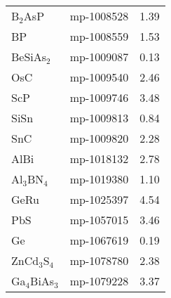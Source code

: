 \begin{center}
\begin{longtable}{M{3.5cm} M{6.5cm} M{2.0cm}}
  B$_2$AsP & mp-1008528 & 1.39\\
  BP & mp-1008559 & 1.53\\
  BeSiAs$_2$ & mp-1009087 & 0.13\\
  OsC & mp-1009540 & 2.46\\
  ScP & mp-1009746 & 3.48\\
  SiSn & mp-1009813 & 0.84\\
  SnC & mp-1009820 & 2.28\\
  AlBi & mp-1018132 & 2.78\\
  Al$_3$BN$_4$ & mp-1019380 & 1.10\\
  GeRu & mp-1025397 & 4.54\\
  PbS & mp-1057015 & 3.46\\
  Ge & mp-1067619 & 0.19\\
  ZnCd$_3$S$_4$ & mp-1078780 & 2.38\\
  Ga$_4$BiAs$_3$ & mp-1079228 & 3.37\\
  \hline
\end{longtable}
\end{center}

